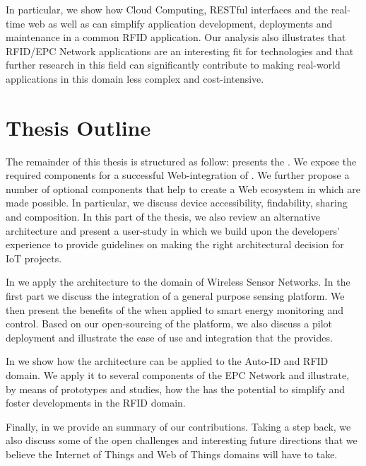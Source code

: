In particular, we show how Cloud Computing, RESTful interfaces and the real-time web as well as \pMashups{} can simplify application development, deployments and maintenance in a common RFID application. Our analysis also illustrates that RFID/EPC Network applications are an interesting fit for \WoT{} technologies and that further research in this field can significantly contribute to making real-world applications in this domain less complex and cost-intensive. 

\section{Thesis Outline}
The remainder of this thesis is structured as follow:  presents the \WoTA{}. We expose the required components for a successful Web-integration of \sts{}. We further propose a number of optional components that help to create a Web ecosystem in which \pMashups{} are made possible. In particular, we discuss device accessibility, findability, sharing and composition. In this part of the thesis, we also review an alternative architecture and present a user-study in which we build upon the developers' experience to provide guidelines on making the right architectural decision for IoT projects. 

In  we apply the architecture to the domain of Wireless Sensor Networks. In the first part we discuss the integration of a general purpose sensing platform. We then present the benefits of the \WoTA{} when applied to smart energy monitoring and control. Based on our open-sourcing of the platform, we also discuss a pilot deployment and illustrate the ease of use and integration that the \WoTA{} provides.

In  we show how the architecture can be applied to the Auto-ID and RFID domain. We apply it to several components of the EPC Network and illustrate, by means of prototypes and studies, how the \WoTA{} has the potential to simplify and foster developments in the RFID domain.

Finally, in  we provide an summary of our contributions. Taking a step back, we also discuss some of the open challenges and interesting future directions that we believe the Internet of Things and Web of Things domains will have to take.